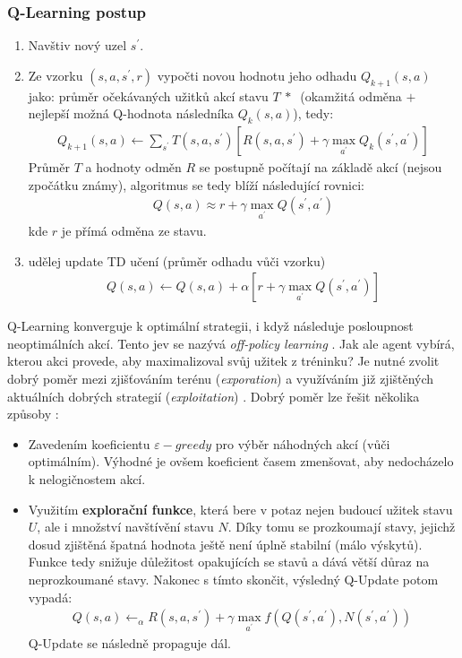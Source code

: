 \subsubsection{Q-Learning postup}
\label{teorie:qlearning}
\begin{enumerate}
  \item Navštiv nový uzel $s^\prime$.
  \item Ze vzorku $(s,a,s^\prime,r)$ vypočti novou hodnotu jeho odhadu $Q_{k+1}(s,a)$ jako:
  \newline
    průměr očekávaných užitků akcí stavu $T\:*\:$ (okamžitá odměna $+$ nejlepší možná Q-hodnota následníka $Q_{k}(s,a)$), tedy:
    \begin{align}
    Q_{k+1}(s,a) \leftarrow \sum_{s^\prime} T(s,a,s^\prime) \left[ R(s,a,s^\prime) + \gamma \max_{a^\prime} Q_k(s^\prime,a^\prime)\right]
    \end{align}
    Průměr $T$ a hodnoty odměn $R$ se postupně počítají na základě akcí (nejsou zpočátku známy), algoritmus se tedy blíží následující rovnici:
    \begin{align}
    Q(s,a) \approx r + \gamma \max_{a^\prime}Q(s^\prime,a^\prime)
    \end{align}
    kde $r$ je přímá odměna ze stavu.
  \item udělej update TD učení (průměr odhadu vůči vzorku)
    \begin{align}
    \label{eq:qupdate}
     Q(s,a) \leftarrow  Q(s,a) + \alpha \left [ r + \gamma \max_{a^\prime} Q(s^\prime,a^\prime) \right]
    \end{align}
\end{enumerate}
Q-Learning konverguje k optimální strategii, i když následuje posloupnost neoptimálních akcí. Tento jev se nazývá \textit{off-policy learning} \cite{RLIntro}.
Jak ale agent vybírá, kterou akci provede, aby maximalizoval svůj užitek z tréninku? Je nutné zvolit dobrý poměr mezi zjišťováním terénu (\textit{exporation}) a využíváním již zjištěných aktuálních dobrých strategií (\textit{exploitation}) \cite{RLpaper}. Dobrý poměr lze řešit několika způsoby \cite{berkeley}:
\begin{itemize}
  \item Zavedením koeficientu $\varepsilon-greedy$ pro výběr náhodných akcí (vůči optimálním). Výhodné je ovšem koeficient časem zmenšovat, aby nedocházelo k nelogičnostem akcí.
  \item Využitím \textbf{explorační funkce}, která bere v potaz nejen budoucí užitek stavu $U$, ale i množství navštívění stavu $N$. Díky tomu se prozkoumají stavy, jejichž dosud zjištěná špatná hodnota ještě není úplně stabilní (málo výskytů). Funkce tedy snižuje důležitost opakujících se stavů a dává větší důraz na neprozkoumané stavy. Nakonec s tímto skončit, výsledný Q-Update potom vypadá:
  \begin{align}
  Q(s,a) \leftarrow_\alpha R(s,a,s^\prime) + \gamma \max_{a^\prime} f(Q(s^\prime,a^\prime),N(s^\prime,a^\prime))\
  \end{align}
  Q-Update se následně propaguje dál.
\end{itemize}
